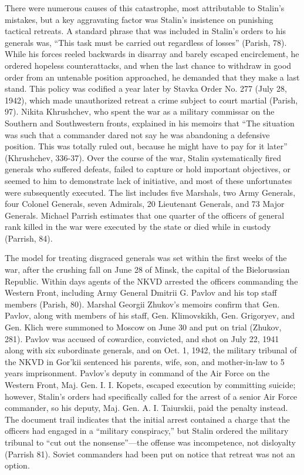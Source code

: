 \documentclass[11pt,]{article}
\begin{document}
There were numerous causes of this catastrophe, most attributable to Stalin's mistakes, but a key aggravating factor was Stalin's insistence on punishing tactical retreats.  A standard phrase that was included in Stalin's orders to his generals was, ``This task must be carried out regardless of losses'' (Parish, 78).  While his forces reeled backwards in disarray and barely escaped encirclement, he ordered hopeless counterattacks, and when the last chance to withdraw in good order from an untenable position approached, he demanded that they make a last stand.  This policy was codified a year later by Stavka Order No. 277 (July 28, 1942), which made unauthorized retreat a crime subject to court martial (Parish, 97).  Nikita Khrushchev, who spent the war as a military commissar on the Southern and Southwestern fronts, explained in his memoirs that ``The situation was such that a commander dared not say he was abandoning a defensive position.  This was totally ruled out, because he might have to pay for it later'' (Khrushchev, 336-37).  Over the course of the war, Stalin systematically fired generals who suffered defeats, failed to capture or hold important objectives, or seemed to him to demonstrate lack of initiative, and most of these unfortunates were subsequently executed.  The list includes five Marshals, two Army Generals, four Colonel Generals, seven Admirals, 20 Lieutenant Generals, and 73 Major Generals.  Michael Parrish estimates that one quarter of the officers of general rank killed in the war were executed by the state or died while in custody (Parrish, 84).

The model for treating disgraced generals was set within the first weeks of the war, after the crushing fall on June 28 of Minsk, the capital of the Bielorussian Republic.  Within days agents of the NKVD arrested the officers commanding the Western Front, including Army General Dmitrii G. Pavlov and his top staff members (Parish, 80).  Marshal Georgii Zhukov’s memoirs confirm that Gen. Pavlov, along with members of his staff, Gen. Klimovskikh, Gen. Grigoryev, and Gen. Klich were summoned to Moscow on June 30 and put on trial (Zhukov, 281). Pavlov was accused of cowardice, convicted, and shot on July 22, 1941 along with six subordinate generals, and on Oct. 1, 1942, the military tribunal of the NKVD in Gor’kii sentenced his parents, wife, son, and mother-in-law to 5 years imprisonment.  Pavlov's deputy in command of the Air Force on the Western Front, Maj. Gen. I. I. Kopets, escaped execution by committing suicide; however, Stalin's orders had specifically called for the arrest of a senior Air Force commander, so his deputy, Maj. Gen. A. I. Taiurskii, paid the penalty instead. The document trail indicates that the initial arrest contained a charge that the officers had engaged in a ``military conspiracy,'' but Stalin ordered the military tribunal to ``cut out the nonsense''---the offense was incompetence, not disloyalty (Parrish 81).  Soviet commanders had been put on notice that retreat was not an option.
\end{document}

